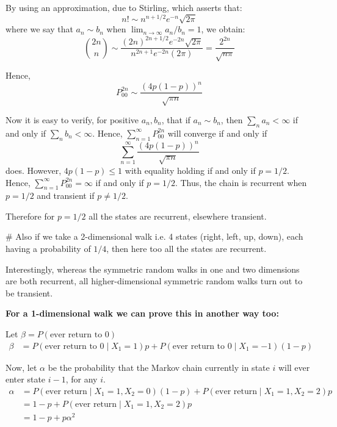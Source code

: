 By using an approximation, due to Stirling, which asserts that:
\begin{equation}
    n! \sim n^{n+1/2} e^{-n} \sqrt{2\pi} \tag{4.3}
\end{equation}
where we say that $a_n \sim b_n$ when $\lim_{n \to \infty} a_n/b_n = 1$, we obtain:
\[ \binom{2n}{n} \sim \frac{(2n)^{2n+1/2} e^{-2n} \sqrt{2\pi}}{n^{2n+1} e^{-2n} (2\pi)} = \frac{2^{2n}}{\sqrt{n\pi}} \]

Hence,
\[ P_{00}^{2n} \sim \frac{(4p(1-p))^n}{\sqrt{\pi n}} \]

Now it is easy to verify, for positive $a_n, b_n$, that if $a_n \sim b_n$, then $\sum_n a_n < \infty$ if and only if $\sum_n b_n < \infty$. Hence, $\sum_{n=1}^\infty P_{00}^{2n}$ will converge if and only if
\[ \sum_{n=1}^\infty \frac{(4p(1-p))^n}{\sqrt{\pi n}} \]
does. However, $4p(1-p) \le 1$ with equality holding if and only if $p = 1/2$. Hence, $\sum_{n=1}^\infty P_{00}^{2n} = \infty$ if and only if $p = 1/2$. Thus, the chain is recurrent when $p = 1/2$ and transient if $p \ne 1/2$.

Therefore for $p = 1/2$ all the states are recurrent, elsewhere transient.

\# Also if we take a 2-dimensional walk i.e. 4 states (right, left, up, down), each having a probability of $1/4$, then here too all the states are recurrent.

Interestingly, whereas the symmetric random walks in one and two dimensions are both recurrent, all higher-dimensional symmetric random walks turn out to be transient.

\vspace{0.3cm}
\textbf{For a 1-dimensional walk we can prove this in another way too:}

Let $\beta = P(\text{ever return to } 0)$
\begin{align*}
    \beta &= P(\text{ever return to } 0 \mid X_1 = 1)p + P(\text{ever return to } 0 \mid X_1 = -1)(1 - p)
\end{align*}

Now, let $\alpha$ be the probability that the Markov chain currently in state $i$ will ever enter state $i - 1$, for any $i$.
\begin{align*}
    \alpha &= P(\text{ever return} \mid X_1 = 1, X_2 = 0)(1 - p) + P(\text{ever return} \mid X_1 = 1, X_2 = 2)p \\
    &= 1 - p + P(\text{ever return} \mid X_1 = 1, X_2 = 2)p \\
    &= 1 - p + p\alpha^2
\end{align*}

